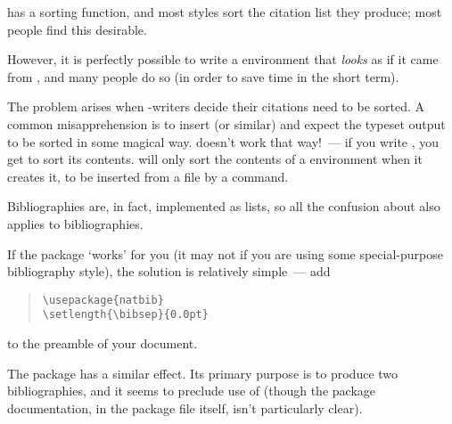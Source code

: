 
\BibTeX{} has a sorting function, and most \BibTeX{} styles sort the
citation list they produce; most people find this desirable.

However, it is perfectly possible to write a
 environment that \emph{looks} as if it
came from \BibTeX{}, and many people do so (in order to save time in
the short term).

The problem arises when -writers decide
their citations need to be sorted.  A common misapprehension is to
insert  (or similar) and expect
the typeset output to be sorted in some magical way.  \BibTeX{}
doesn't work that way!~--- if you write ,
you get to sort its contents.  \BibTeX{} will only sort the contents
of a  environment when it creates it, to
be inserted from a  file by a  command.


Bibliographies are, in fact, implemented as lists, so all the
confusion about  also
applies to bibliographies.

If the  package `works' for you (it may not if you are using
some special-purpose bibliography style), the solution is relatively
simple~--- add
\begin{quote}
\begin{verbatim}
\usepackage{natbib}
\setlength{\bibsep}{0.0pt}
\end{verbatim}
\end{quote}
to the preamble of your document.

The  package has a similar effect.  Its primary
purpose is to produce two bibliographies, and it seems to preclude use
of \BibTeX{} (though the package documentation, in the package file
itself, isn't particularly clear).

